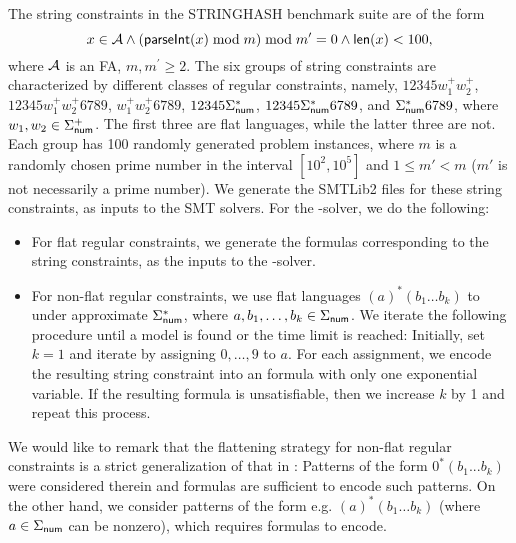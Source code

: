 The string constraints in the STRINGHASH benchmark suite are of the form 
$$x \in \mathcal{A} \wedge \left( \textsf{parseInt}(x) \bmod m \right) \bmod m^\prime = 0   \notag \wedge \textsf{len}(x) < 100,$$ 
where $\mathcal{A}$ is an FA, $m, m^\prime \ge 2.$ 
The six groups of string constraints are characterized by different classes of regular constraints, namely, $12345w^+_1 w^+_2$,  $12345 w^+_1  w^+_2 6789$, $w^+_1 w^+_2 6789$, $12345\Sigma_{\sf num}^*$, $12345\Sigma_{\sf num}^* 6789$, and $\Sigma_{\sf num}^* 6789$, where $w_1,w_2 \in \Sigma^+_{\sf num}$. The first three are flat languages, while the latter three are not. Each group has 100 randomly generated problem instances, where $m$ is a randomly chosen prime number in the interval $[10^2, 10^5]$ and $1 \le m' < m$ ($m'$ is not necessarily a prime number). We generate the SMTLib2 files for these string constraints, as inputs to the SMT solvers. For the {\paexp}-solver, we do the following:   
\begin{itemize}
\item For flat regular constraints, we generate the {\paexp} formulas corresponding to the string constraints, as the inputs to the {\paexp}-solver.
%
\item For non-flat regular constraints, we use flat languages $(a)^* (b_{1} \ldots b_{k})$ to under approximate 
$\Sigma_{\sf num}^*$,  where $a, b_1,\ldots, b_k \in \Sigma_{\sf num}$. 
%
%
We iterate the following procedure until a model is found or the time limit is reached: Initially, set $k=1$ and iterate by assigning $0, \ldots, 9$ to $a$. For each assignment, we encode the resulting string constraint into an {\paexp} formula with only one exponential variable. If the resulting {\paexp} formula is unsatisfiable, then we increase $k$ by 1 and repeat this process. 
\end{itemize}
We would like to remark that the flattening strategy for non-flat regular constraints is a strict generalization of that in \cite{Parosh:20:PLDI}: Patterns of the form $0^*(b_1...b_k)$ were considered therein and {\pa} formulas are sufficient to encode such patterns. On the other hand, we consider patterns of the form e.g. $(a)^* (b_1 \ldots b_k)$ (where $a \in \Sigma_{\sf num}$ can be nonzero), which requires {\paexp} formulas to encode.


